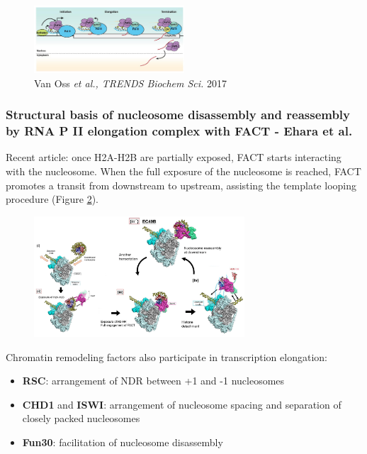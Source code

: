 \begin{figure}
\centering
\includegraphics[width=0.5\textwidth]{../_resources/Screenshot_2022-10-05_at_23-05-58.png}
\caption{Van Oss \emph{et al., TRENDS Biochem Sci.} 2017}
\label{fig:el}
\end{figure}


\hypertarget{structural-basis-of-nucleosome-disassembly-and-reassembly-by-rna-p-ii-elongation-complex-with-fact---ehara-et-al.}{%
\subsubsection{Structural basis of nucleosome disassembly and reassembly by RNA P II elongation complex with FACT - Ehara et al.}\label{structural-basis-of-nucleosome-disassembly-and-reassembly-by-rna-p-ii-elongation-complex-with-fact---ehara-et-al.}}

Recent article: once H2A-H2B are partially exposed, FACT starts interacting with the nucleosome. When the full exposure of the nucleosome is reached, FACT promotes a transit from downstream to upstream, assisting the template looping procedure (Figure \ref{fig:exp}).

\begin{figure}
\centering
\includegraphics[width=0.7\textwidth]{../_resources/Screenshot_2022-10-10_at_10-35-12.png}
\caption{}
\label{fig:exp}
\end{figure}

Chromatin remodeling factors also participate in transcription elongation:

\begin{itemize}
\tightlist
\item
  \textbf{RSC}: arrangement of NDR between +1 and -1 nucleosomes
\item
  \textbf{CHD1} and \textbf{ISWI}: arrangement of nucleosome spacing and separation of closely packed nucleosomes
\item
  \textbf{Fun30}: facilitation of nucleosome disassembly
\end{itemize}

